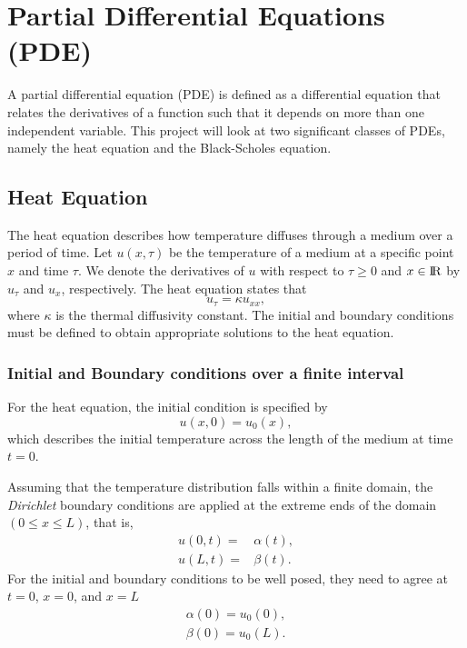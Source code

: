 \section{Partial Differential Equations (PDE)}\label{sec:pde}
A partial differential equation (PDE) is defined as a differential equation that relates the derivatives
of a function such that it depends on more than one independent variable.\cite{olver_2014_pde}
This project will look at two significant classes of PDEs, namely the heat equation and the Black-Scholes equation.

\subsection{Heat Equation}\label{sec:heat}
The heat equation describes how temperature diffuses through a medium over a period of time. 
Let $u(x, \tau)$ be the temperature of a medium 
at a specific point $x$ and time $\tau$.
We denote the derivatives of $u$ with respect to $\tau\geq 0$ 
and $x\in{\rm I\!R}$ by $u_\tau$ and $u_x$, respectively.
The heat equation \cite{leveque_2007} states that 
\begin{equation}
u_{\tau} = \kappa u_{xx}, \label{eq:heat-equation}
\end{equation}
where $\kappa$ is the thermal diffusivity constant.
The initial and boundary conditions must be defined to obtain appropriate solutions to the heat equation. 

\subsubsection{Initial and Boundary conditions over a finite interval}
For the heat equation, the initial condition is specified by
\begin{equation}
u(x,0) = u_0(x),
\end{equation}
which describes the initial temperature across the length of the medium at time $t = 0$.

Assuming that the temperature distribution falls within a finite domain, the \textit{Dirichlet} boundary conditions are applied at the extreme ends of the domain \( (0 \leq x \leq L) \), that is,
\begin{subequations}
\begin{align}
u(0,t) ={}& \alpha(t),\\
u(L,t) ={}& \beta(t).
\end{align}
\end{subequations}
For the initial and boundary conditions to be 
well posed, they need to agree at $t=0$, $x=0$, 
and $x=L$
\begin{gather*} 
\alpha(0) = u_0(0), \\
\beta(0) = u_0(L).
\end{gather*} 


